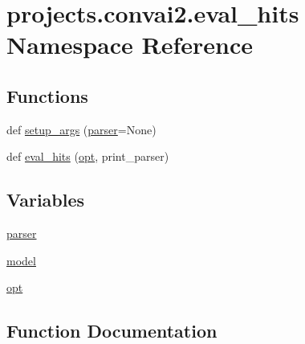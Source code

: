 \hypertarget{namespaceprojects_1_1convai2_1_1eval__hits}{}\section{projects.\+convai2.\+eval\+\_\+hits Namespace Reference}
\label{namespaceprojects_1_1convai2_1_1eval__hits}
\subsection*{Functions}
\begin{DoxyCompactItemize}
\item 
def \hyperlink{namespaceprojects_1_1convai2_1_1eval__hits_a276af35abce11628a8e697b370218cf4}{setup\+\_\+args} (\hyperlink{namespaceprojects_1_1convai2_1_1eval__hits_a4b2be0a82e432138d4596303739b8278}{parser}=None)
\item 
def \hyperlink{namespaceprojects_1_1convai2_1_1eval__hits_a400fd6a2e183f2cf1da6ebeff169fe70}{eval\+\_\+hits} (\hyperlink{namespaceprojects_1_1convai2_1_1eval__hits_a2e915e9036283f216d5de205f3185ba6}{opt}, print\+\_\+parser)
\end{DoxyCompactItemize}
\subsection*{Variables}
\begin{DoxyCompactItemize}
\item 
\hyperlink{namespaceprojects_1_1convai2_1_1eval__hits_a4b2be0a82e432138d4596303739b8278}{parser}
\item 
\hyperlink{namespaceprojects_1_1convai2_1_1eval__hits_a3956f404156228d738c84aa0fe56be39}{model}
\item 
\hyperlink{namespaceprojects_1_1convai2_1_1eval__hits_a2e915e9036283f216d5de205f3185ba6}{opt}
\end{DoxyCompactItemize}


\subsection{Function Documentation}
\mbox{\label{namespaceprojects_1_1convai2_1_1eval__hits_a400fd6a2e183f2cf1da6ebeff169fe70}} 
